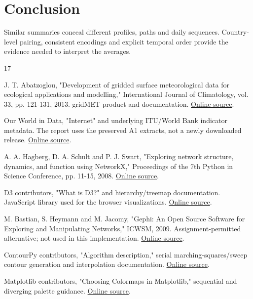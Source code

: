 \documentclass[conference,a4paper]{IEEEtran}
\begin{document}
\section{Conclusion}

Similar summaries conceal different profiles, paths and daily sequences. Country-level pairing, consistent encodings and explicit temporal order provide the evidence needed to interpret the averages.



\begin{thebibliography}{17}

 J. T. Abatzoglou, "Development of gridded surface meteorological data for ecological applications and modelling," International Journal of Climatology, vol. 33, pp. 121-131, 2013. gridMET product and documentation. \href{https://www.climatologylab.org/gridmet.html}{Online source}.

 Our World in Data, "Internet" and underlying ITU/World Bank indicator metadata. The report uses the preserved A1 extracts, not a newly downloaded release. \href{https://ourworldindata.org/internet}{Online source}.

 A. A. Hagberg, D. A. Schult and P. J. Swart, "Exploring network structure, dynamics, and function using NetworkX," Proceedings of the 7th Python in Science Conference, pp. 11-15, 2008. \href{https://aric.hagberg.org/papers/hagberg-2008-exploring.pdf}{Online source}.

 D3 contributors, "What is D3?" and hierarchy/treemap documentation. JavaScript library used for the browser visualizations. \href{https://d3js.org/what-is-d3}{Online source}.

 M. Bastian, S. Heymann and M. Jacomy, "Gephi: An Open Source Software for Exploring and Manipulating Networks," ICWSM, 2009. Assignment-permitted alternative; not used in this implementation. \href{https://doi.org/10.1609/icwsm.v3i1.13937}{Online source}.

 ContourPy contributors, "Algorithm description," serial marching-squares/sweep contour generation and interpolation documentation. \href{https://contourpy.readthedocs.io/en/stable/description.html}{Online source}.

 Matplotlib contributors, "Choosing Colormaps in Matplotlib," sequential and diverging palette guidance. \href{https://matplotlib.org/stable/users/explain/colors/colormaps.html}{Online source}.


\end{thebibliography}
\end{document}
